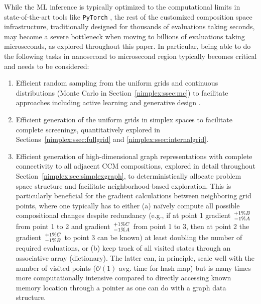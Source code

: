 While the ML inference is typically optimized to the computational limits in state-of-the-art tools like \texttt{PyTorch} \cite{Paszke2019PyTorch:Library}, the rest of the customized composition space infrastructure, traditionally designed for thousands of evaluations taking seconds, may become a severe bottleneck when moving to billions of evaluations taking microseconds, as explored throughout this paper. In particular, being able to do the following tasks in nanosecond to microsecond region typically becomes critical and needs to be considered:

\begin{enumerate}

    \item Efficient random sampling from the uniform grids and continuous distributions (Monte Carlo in Section~\ref{nimplex:ssec:mc}) to facilitate approaches including active learning \cite{Rao2022MachineDiscovery} and generative design \cite{Debnath2021GenerativeAlloys}.
    
    \item Efficient generation of the uniform grids in simplex spaces to facilitate complete screenings, quantitatively explored in Sections~\ref{nimplex:ssec:fullgrid} and \ref{nimplex:ssec:internalgrid}.
    
    \item Efficient generation of high-dimensional graph representations with complete connectivity to all adjacent CCM compositions, explored in detail throughout Section~\ref{nimplex:sec:simplexgraph}, to deterministically allocate problem space structure and facilitate neighborhood-based exploration. This is particularly beneficial for the gradient calculations between neighboring grid points, where one typically has to either (a) na\"ively compute all possible compositional changes despite redundancy (e.g., if at point 1 gradient $+1\%B \atop -1\%A$ from point 1 to 2 and gradient $+1\%C \atop -1\%A$ from point 1 to 3, then at point 2 the gradient $+1\%C \atop -1\%B$ to point 3 can be known) at least doubling the number of required evaluations, or (b) keep track of all visited states through an associative array (dictionary). The latter can, in principle, scale well with the number of visited points ($\mathcal{O}(1)$ avg. time for hash map) but is many times more computationally intensive compared to directly accessing known memory location through a pointer as one can do with a graph data structure.
    
\end{enumerate}


